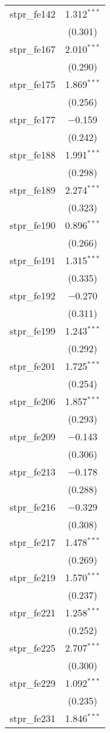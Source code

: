 \begin{table}[!htbp]
\begin{tabular}{@{\extracolsep{5pt}}lc}
  stpr\_fe142 & 1.312$^{***}$ \\ 
  & (0.301) \\ 
  stpr\_fe167 & 2.010$^{***}$ \\ 
  & (0.290) \\ 
  stpr\_fe175 & 1.869$^{***}$ \\ 
  & (0.256) \\ 
  stpr\_fe177 & $-$0.159 \\ 
  & (0.242) \\ 
  stpr\_fe188 & 1.991$^{***}$ \\ 
  & (0.298) \\ 
  stpr\_fe189 & 2.274$^{***}$ \\ 
  & (0.323) \\ 
  stpr\_fe190 & 0.896$^{***}$ \\ 
  & (0.266) \\ 
  stpr\_fe191 & 1.315$^{***}$ \\ 
  & (0.335) \\ 
  stpr\_fe192 & $-$0.270 \\ 
  & (0.311) \\ 
  stpr\_fe199 & 1.243$^{***}$ \\ 
  & (0.292) \\ 
  stpr\_fe201 & 1.725$^{***}$ \\ 
  & (0.254) \\ 
  stpr\_fe206 & 1.857$^{***}$ \\ 
  & (0.293) \\ 
  stpr\_fe209 & $-$0.143 \\ 
  & (0.306) \\ 
  stpr\_fe213 & $-$0.178 \\ 
  & (0.288) \\ 
  stpr\_fe216 & $-$0.329 \\ 
  & (0.308) \\ 
  stpr\_fe217 & 1.478$^{***}$ \\ 
  & (0.269) \\ 
  stpr\_fe219 & 1.570$^{***}$ \\ 
  & (0.237) \\ 
  stpr\_fe221 & 1.258$^{***}$ \\ 
  & (0.252) \\ 
  stpr\_fe225 & 2.707$^{***}$ \\ 
  & (0.300) \\ 
  stpr\_fe229 & 1.092$^{***}$ \\ 
  & (0.235) \\ 
  stpr\_fe231 & 1.846$^{***}$ \\ 

\end{tabular}
\end{table}
